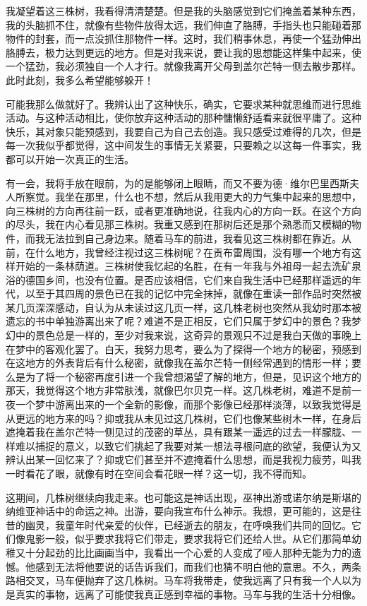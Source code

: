 \par 我凝望着这三株树，我看得清清楚楚。但是我的头脑感觉到它们掩盖着某种东西，我的头脑抓不住，就像有些物件放得太远，我们伸直了胳膊，手指头也只能碰着那物件的封套，而一点没抓住那物件一样。这时，我们稍事休息，再使一个猛劲伸出胳膊去，极力达到更远的地方。但是对我来说，要让我的思想能这样集中起来，使一个猛劲，我必须独自一个人才行。就像我离开父母到盖尔芒特一侧去散步那样。此时此刻，我多么希望能够躲开！
\par 可能我那么做就好了。我辨认出了这种快乐，确实，它要求某种就思维而进行思维活动。与这种活动相比，使你放弃这种活动的那种慵懒舒适看来就很平庸了。这种快乐，其对象只能预感到，我要自己为自己去创造。我只感受过难得的几次，但是每一次我似乎都觉得，这中间发生的事情无关紧要，只要赖之以这每一件事实，我都可以开始一次真正的生活。
\par 有一会，我将手放在眼前，为的是能够闭上眼睛，而又不要为德·维尔巴里西斯夫人所察觉。我坐在那里，什么也不想，然后从我用更大的力气集中起来的思想中，向三株树的方向再往前一跃，或者更准确地说，往我内心的方向一跃。在这个方向的尽头，我在内心看见那三株树。我重又感到在那树后还是那个熟悉而又模糊的物件，而我无法拉到自己身边来。随着马车的前进，我看见这三株树都在靠近。从前，在什么地方，我曾经注视过这三株树呢？在贡布雷周围，没有哪一个地方有这样开始的一条林荫道。三株树使我忆起的名胜，在有一年我与外祖母一起去洗矿泉浴的德国乡间，也没有位置。是否应该相信，它们来自我生活中已经那样遥远的年代，以至于其四周的景色已在我的记忆中完全抹掉，就像在重读一部作品时突然被某几页深深感动，自认为从未读过这几页一样，这几株老树也突然从我幼时那本被遗忘的书中单独游离出来了呢？难道不是正相反，它们只属于梦幻中的景色？我梦幻中的景色总是一样的，至少对我来说，这奇异的景观只不过是我白天做的事晚上在梦中的客观化罢了。白天，我努力思考，要么为了探得一个地方的秘密，预感到在这地方的外表背后有什么秘密，就像我在盖尔芒特一侧经常遇到的情形一样；要么是为了将一个秘密再度引进一个我曾想渴望了解的地方，但是，见识这个地方的那天，我觉得这个地方非常肤浅，就像巴尔贝克一样。这几株老树，难道不是前一夜一个梦中游离出来的一个全新的影像，而那个影像已经那样淡薄，以致我觉得是从更远的地方来的吗？抑或我从未见过这几株树，它们也像某些树木一样，在身后遮掩着我在盖尔芒特一侧见过的茂密的草丛，具有跟某一遥远的过去一样朦胧、一样难以捕捉的意义，以致它们挑起了我要对某一想法寻根问底的欲望，我便认为又辨认出某一回忆来了？抑或它们甚至并不遮掩着什么思想，而是我视力疲劳，叫我一时看花了眼，就像有时在空间会看花眼一样？这一切，我不得而知。
\par 这期间，几株树继续向我走来。也可能这是神话出现，巫神出游或诺尔纳是斯堪的纳维亚神话中的命运之神。出游，要向我宣布什么神示。我想，更可能的，这是往昔的幽灵，我童年时代亲爱的伙伴，已经逝去的朋友，在呼唤我们共同的回忆。它们像鬼影一般，似乎要求我将它们带走，要求我将它们还给人世。从它们那简单幼稚又十分起劲的比比画画当中，我看出一个心爱的人变成了哑人那种无能为力的遗憾。他感到无法将他要说的话告诉我们，而我们也猜不明白他的意思。不久，两条路相交叉，马车便抛弃了这几株树。马车将我带走，使我远离了只有我一个人以为是真实的事物，远离了可能使我真正感到幸福的事物。马车与我的生活十分相像。
